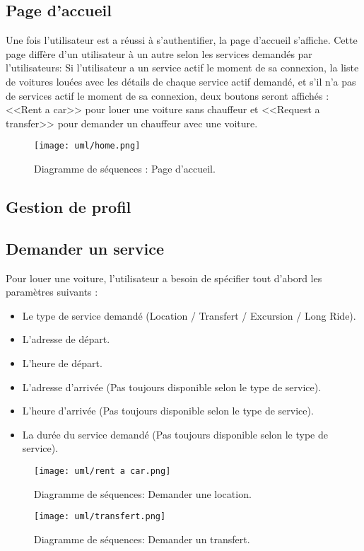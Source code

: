 \subsection{Page d'accueil}
Une fois l'utilisateur est a réussi à s'authentifier, la page d'accueil s'affiche. Cette page diffère d'un utilisateur à un autre selon les services demandés par l'utilisateurs: Si l'utilisateur a un service actif le moment de sa connexion, la liste de voitures louées avec les détails de chaque service actif demandé, et s'il n'a pas de services actif le moment de sa connexion, deux boutons seront affichés : <<Rent a car>> pour louer une voiture sans chauffeur et <<Request a transfer>> pour demander un chauffeur avec une voiture.
\vspace{1cm}
\begin{figure}[H]
    \centering
    \texttt{[image: uml/home.png]}
    \vspace{1cm}
    \caption{Diagramme de séquences : Page d'accueil.}
    \label{fig:seq_home}
\end{figure}
\vspace{1cm}
\subsection{Gestion de profil}
\subsection{Demander un service}
Pour louer une voiture, l'utilisateur a besoin de spécifier tout d'abord les paramètres suivants :
\begin{itemize}
    \item Le type de service demandé (Location / Transfert / Excursion / Long Ride).
    \item L'adresse de départ.
    \item L'heure de départ.
    \item L'adresse d'arrivée (Pas toujours disponible selon le type de service).
    \item L'heure d'arrivée (Pas toujours disponible selon le type de service).
    \item La durée du service demandé (Pas toujours disponible selon le type de service).
\end{itemize}
\vspace{1cm}
\begin{figure}[H]
    \centering
    \texttt{[image: uml/rent a car.png]}
    \vspace{1cm}
    \caption{Diagramme de séquences: Demander une location.}
    \label{fig:seq_location}
\end{figure}
\vspace{1cm}
\begin{figure}[H]
    \centering
    \texttt{[image: uml/transfert.png]}
    \vspace{1cm}
    \caption{Diagramme de séquences: Demander un transfert.}
    \label{fig:seq_transfert}
\end{figure}
